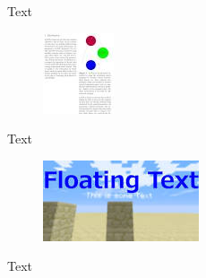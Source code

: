\documentclass[12pt]{article}
\begin{document}
Text
\begin{figure}[h!]
\includegraphics{1.jpg}
\end{figure}
\FloatBarrier
Text
\begin{figure}[h!]
\includegraphics{2.jpg}
\end{figure}
\FloatBarrier
Text
\end{document}
